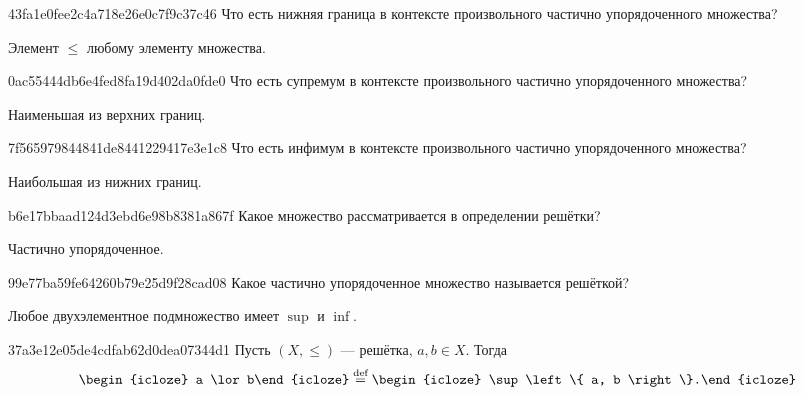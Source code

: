 \begin{note}{43fa1e0fee2c4a718e26e0c7f9c37c46}
    Что есть нижняя граница в контексте произвольного частично упорядоченного множества?

    \begin{cloze}{1}
        Элемент \({ \leqslant }\) любому элементу множества.
    \end{cloze}
\end{note}

\begin{note}{0ac55444db6e4fed8fa19d402da0fde0}
    Что есть супремум в контексте произвольного частично упорядоченного множества?

    \begin{cloze}{1}
        Наименьшая из верхних границ.
    \end{cloze}
\end{note}

\begin{note}{7f565979844841de8441229417e3e1c8}
    Что есть инфимум в контексте произвольного частично упорядоченного множества?

    \begin{cloze}{1}
        Наибольшая из нижних границ.
    \end{cloze}
\end{note}

\begin{note}{b6e17bbaad124d3ebd6e98b8381a867f}
    Какое множество рассматривается в определении решётки?

    \begin{cloze}{1}
        Частично упорядоченное.
    \end{cloze}
\end{note}

\begin{note}{99e77ba59fe64260b79e25d9f28cad08}
    Какое частично упорядоченное множество называется решёткой?

    \begin{cloze}{1}
        Любое двухэлементное подмножество имеет \({ \sup }\) и \({ \inf }\).
    \end{cloze}
\end{note}

\begin{note}{37a3e12e05de4cdfab62d0dea07344d1}
    Пусть \({ (X, \leqslant) }\) --- решётка, \({ a, b \in X }\).
    Тогда
    \[
        \begin{icloze}{2}a \lor b\end{icloze} \overset{\text{def}}= \begin{icloze}{1}\sup \left\{ a, b \right\}.\end{icloze}
    \]
\end{note}


